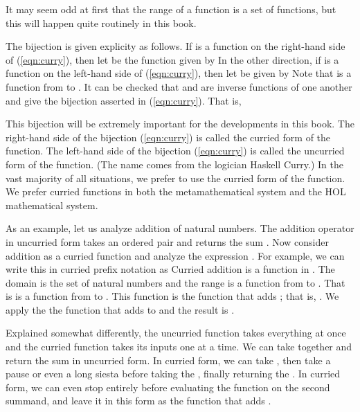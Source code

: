 \documentclass[cup9a]{cupbook}
\begin{document}
It may seem odd at first that the range of a function is a set of functions, but this will happen quite routinely in this book.

The bijection is given explicity as follows.  If  is a function
on the right-hand side of (\ref{eqn:curry}), then let 
be the function given by 
In the other direction, if  is a function on the left-hand side of (\ref{eqn:curry}), then let  be given by
Note that  is a function from  to .
It can be  checked that  and  are inverse functions of one another and give the bijection asserted in (\ref{eqn:curry}).
That is,

This bijection will be extremely important for the developments in this book.  The right-hand side of the bijection (\ref{eqn:curry}) is called the curried form of the function.  The left-hand side of the bijection (\ref{eqn:curry}) is called the uncurried form of the function.  (The name comes from the logician Haskell Curry.)   In the vast majority of all situations, we prefer to use the curried form of the function.  We prefer curried functions in both the metamathematical system and the HOL mathematical system.

As an example, let us analyze addition of natural numbers.  The addition operator in uncurried form takes an ordered pair  and
returns the sum .   Now consider addition as a curried function and analyze the expression .  For example, we can write this in curried prefix notation as
Curried addition is a function in .  The domain
is the set of natural numbers and the range is a function from  to .
That is  is a function from  to .  This function is the function that adds ; that is, .  We apply the
the function that adds  to  and the result is .

Explained somewhat differently, the uncurried function takes everything at once and the curried function takes its inputs one at a time.  We can take  together and return the sum  in uncurried form.  In curried form, we can take , then take a pause or even a long siesta before taking the , finally returning the .  In curried form, we can even stop entirely before evaluating the function  on the second summand, and leave it in this form as the function that adds .
\end{document}
